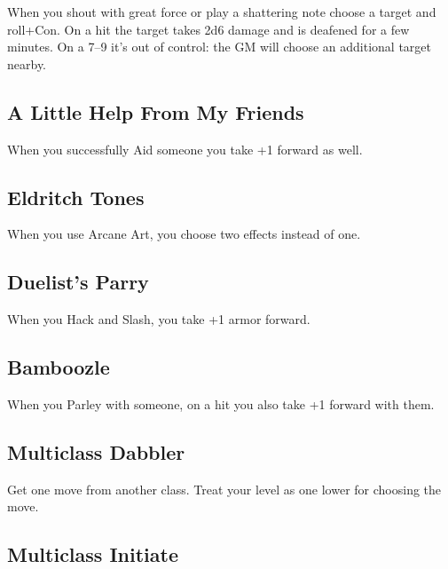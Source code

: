 When you shout with great force or play a shattering note choose a target and roll+Con. On a hit the target takes 2d6 damage and is deafened for a few minutes. On a 7–9 it's out of control: the GM will choose an additional target nearby.

         
\subsection{A Little Help From My Friends}   
         

When you successfully Aid someone you take +1 forward as well.

         
\subsection{Eldritch Tones}    
         

When you use Arcane Art, you choose two effects instead of one.

         
\subsection{Duelist's Parry}    
         

When you Hack and Slash, you take +1 armor forward.

         
\subsection{Bamboozle}   
         

When you Parley with someone, on a hit you also take +1 forward with them.

         
\subsection{Multiclass Dabbler}    
         

Get one move from another class. Treat your level as one lower for choosing the move.

         
\subsection{Multiclass Initiate}    
         

